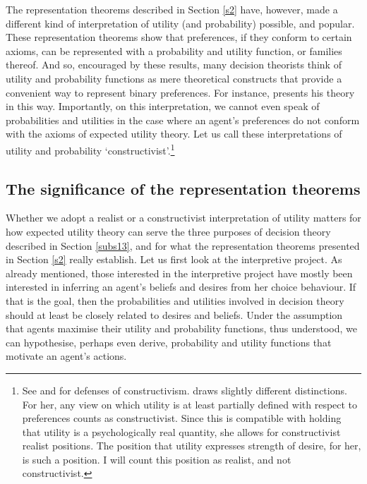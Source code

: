The representation theorems described in Section \ref{s2} have, however, made a different kind of interpretation of utility (and probability) possible, and popular. These representation theorems show that preferences, if they conform to certain axioms, can be represented with a probability and utility function, or families thereof. And so, encouraged by these results, many decision theorists think of utility and probability functions as mere theoretical constructs that provide a convenient way to represent binary preferences. For instance, \citet{Savage1954} presents his theory in this way.  Importantly, on this interpretation, we cannot even speak of probabilities and utilities in the case where an agent's preferences do not conform with the axioms of expected utility theory. Let us call these interpretations of utility and probability `constructivist'.\footnote{See \citet{Dreier1996} and \citet{Velleman1993} for defenses of constructivism. \citet{Buchak2013} draws slightly different distinctions. For her, any view on which utility is at least partially defined with respect to preferences counts as constructivist. Since this is compatible with holding that utility is a psychologically real quantity, she allows for constructivist realist positions. The position that utility expresses strength of desire, for her, is such a position. I will count this position as realist, and not constructivist.}

\subsection{The significance of the representation theorems}\label{subs32}

Whether we adopt a realist or a constructivist interpretation of utility matters for how expected utility theory can serve the three purposes of decision theory described in Section \ref{subs13}, and for what the representation theorems presented in Section \ref{s2} really establish. Let us first look at the interpretive project. As already mentioned, those interested in the interpretive project have mostly been interested in inferring an agent's beliefs and desires from her choice behaviour. If that is the goal, then the probabilities and utilities involved in decision theory should at least be closely related to desires and beliefs. Under the assumption that agents maximise their utility and probability functions, thus understood, we can hypothesise, perhaps even derive, probability and utility functions that motivate an agent's actions.

